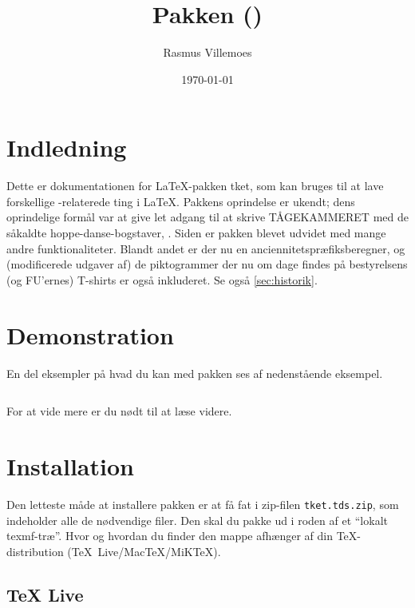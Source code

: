 \documentclass[a4paper,article,oneside,danish]{memoir}
\title{Pakken \ptket (\pTKETVer)}
\author{Rasmus Villemoes}
\date{\today}
\newcommand{\pakkenavn}[1]{\textsf{#1}}
\newcommand{\ptket}{\pakkenavn{tket}\xspace}
\newcommand{\filnavn}[1]{\texttt{#1}}
\newcommand{\mdframedinputminted}[2]{\begin{mdframed}[style=kodestyle]\inputminted{#1}{#2}\end{mdframed}}
\begin{document}
\maketitle

\tableofcontents*

\chapter{Indledning}
\label{cha:indledning}

Dette er dokumentationen for \LaTeX-pakken \ptket, som kan bruges til
at lave forskellige \TK-relaterede ting i \LaTeX. Pakkens oprindelse
er ukendt; dens oprindelige formål var at give let adgang til at
skrive \hbox{TÅGEKAMMERET} med de såkaldte hoppe-danse-bogstaver,
\TKET. Siden er pakken blevet udvidet med mange andre
funktionaliteter. Blandt andet er der nu en
anciennitetspræfiksberegner, og (modificerede udgaver af) de
piktogrammer der nu om dage findes på bestyrelsens (og FU'ernes)
T-shirts er også inkluderet. Se også \vref{sec:historik}.

\chapter{Demonstration}
\label{cha:demonstration}

En del eksempler på hvad du kan med pakken ses af nedenstående
eksempel.
\mdframedinputminted{latex}{eksempel-demo.tex}

\begin{resultat}

\end{resultat}

For at vide mere er du nødt til at læse videre.

\chapter{Installation}
\label{cha:installation}

Den letteste måde at installere pakken er at få fat i zip-filen
\filnavn{tket.tds.zip}, som indeholder alle de nødvendige filer. Den
skal du pakke ud i roden af et \enquote{lokalt texmf-træ}. Hvor og hvordan du
finder den mappe afhænger af din \TeX-distribution (\mbox{\TeX{}
  Live}/\mbox{Mac\TeX}/\mbox{MiK\TeX}).

\section{\TeX{} Live}
\label{sec:tex-live}
\end{document}
